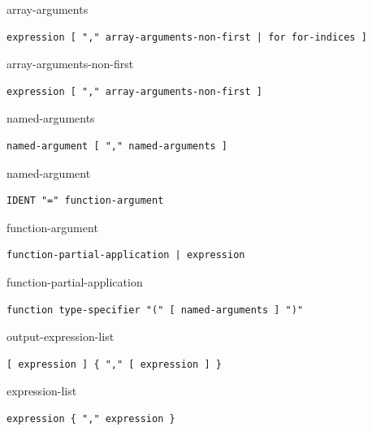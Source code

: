 \begin{production}{array-arguments}
\begin{lstlisting}
expression [ "," array-arguments-non-first | for for-indices ]
\end{lstlisting}
\end{production}

\begin{production}{array-arguments-non-first}
\begin{lstlisting}
expression [ "," array-arguments-non-first ]
\end{lstlisting}
\end{production}

\begin{production}{named-arguments}
\begin{lstlisting}
named-argument [ "," named-arguments ]
\end{lstlisting}
\end{production}

\begin{production}{named-argument}
\begin{lstlisting}
IDENT "=" function-argument
\end{lstlisting}
\end{production}

\begin{production}{function-argument}
\begin{lstlisting}
function-partial-application | expression
\end{lstlisting}
\end{production}

\begin{production}{function-partial-application}
\begin{lstlisting}
function type-specifier "(" [ named-arguments ] ")"
\end{lstlisting}
\end{production}

\begin{production}{output-expression-list}
\begin{lstlisting}
[ expression ] { "," [ expression ] }
\end{lstlisting}
\end{production}

\begin{production}{expression-list}
\begin{lstlisting}
expression { "," expression }
\end{lstlisting}
\end{production}

